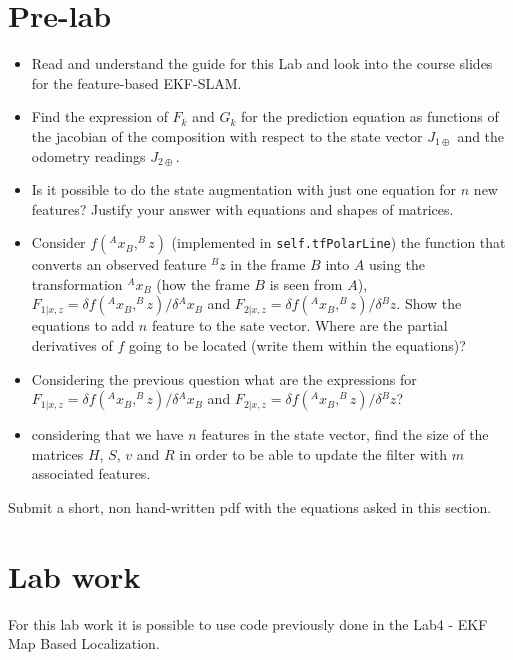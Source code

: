 \documentclass[a4paper,10pt]{article}
\begin{document}
\section{Pre-lab}
\begin{itemize}
	\item Read and understand the guide for this Lab and look into the course slides for the feature-based EKF-SLAM.
	\item Find the expression of $F_k$ and $G_k$ for the prediction equation as functions of the jacobian of the composition with respect to the state vector $J_{1\oplus}$ and the odometry readings $J_{2\oplus}$.
	\item Is it possible to do the state augmentation with just one equation for $n$ new features? Justify your answer with equations and shapes of matrices.
	\item Consider $f(^Ax_B,^Bz)$ (implemented in \texttt{self.tfPolarLine}) the function that converts an observed feature $^Bz$ in the frame $B$ into $A$ using the transformation $^Ax_B$ (how the frame $B$ is seen from  $A$), $F_{1|x,z}=\delta f(^Ax_B,^Bz) / \delta {^Ax_B}$ and $F_{2|x,z}=\delta f(^Ax_B,^Bz) / \delta{^Bz}$. Show the equations to add $n$ feature to the sate vector. Where are the partial derivatives of $f$ going to be located (write them within the equations)? 
	\item Considering the previous question what are the expressions for $F_{1|x,z}=\delta f(^Ax_B,^Bz) / \delta {^Ax_B}$ and $F_{2|x,z}=\delta f(^Ax_B,^Bz) / \delta{^Bz}$?
	\item considering that we have $n$ features in the state vector, find the size of the matrices $H$, $S$, $v$ and $R$ in order to be able to update the filter with $m$ associated features.
\end{itemize}
Submit a short, non hand-written pdf with the equations asked in this section.

\section{Lab work}
For this lab work it is possible to use code previously done in the Lab4 - EKF Map Based Localization.
\end{document}
